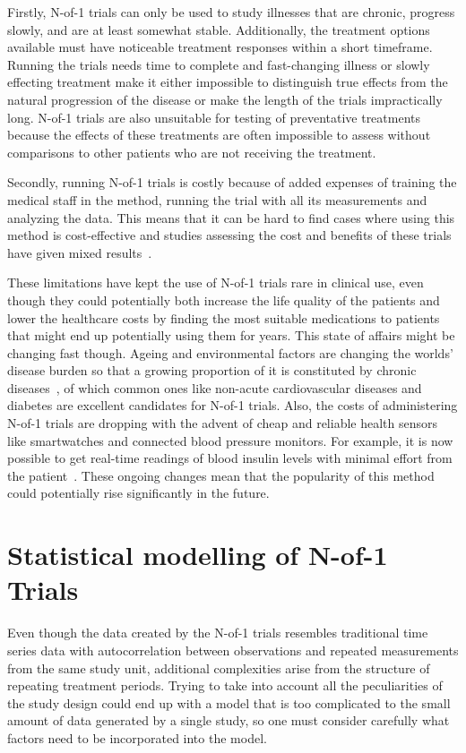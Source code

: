 \documentclass[12pt,a4paper,leqno]{report}
\theoremstyle{plain}
\theoremstyle{definition}
\theoremstyle{remark}
\begin{document}
Firstly, N-of-1 trials can only be used to study illnesses that are chronic,
progress slowly, and are at least somewhat stable. Additionally, the treatment options
available must have noticeable treatment responses within a short timeframe.
Running the trials needs time to complete and fast-changing illness or slowly
effecting treatment make it either impossible to distinguish true effects from
the natural progression of the disease or make the length of the trials
impractically long. N-of-1 trials are also unsuitable for testing of
preventative treatments because the effects of these treatments are often
impossible to assess without comparisons to other patients who are not receiving
the treatment.\ \cite{nofone}

Secondly, running N-of-1 trials is costly because of added expenses of training
the medical staff in the method, running the trial with all its measurements and
analyzing the data. This means that it can be hard to find cases where using
this method is cost-effective and studies assessing the cost and benefits of these trials
have given mixed results\ \cite{costs}.

These limitations have kept the use of N-of-1 trials rare in clinical use, even
though they could potentially both increase the life quality of the patients and
lower the healthcare costs by finding the most suitable medications to patients that
might end up potentially using them for years. This state of affairs might be
changing fast though. Ageing and environmental factors are changing the worlds'
disease burden so that a growing proportion of it is constituted by chronic
diseases\ \cite{diseaseburden}, of which common ones like non-acute cardiovascular
diseases and diabetes are excellent candidates for N-of-1 trials. Also, the costs
of administering N-of-1 trials are dropping with the advent of cheap and reliable
health sensors like smartwatches and connected blood pressure monitors. For
example, it is now possible to get real-time readings of
blood insulin levels with minimal effort from the patient\ \cite{cgm}. These
ongoing changes mean that the popularity of this method could potentially rise
significantly in the future.

\chapter{Statistical modelling of N-of-1 Trials}\label{modelling}

Even though the data created by the N-of-1 trials resembles traditional time
series data with autocorrelation between observations and repeated measurements
from the same study unit, additional complexities arise from the structure of
repeating treatment periods. Trying to take into account all
the peculiarities of the study design could end up with a model that is too complicated to
the small amount of data generated by a single study, so one must consider
carefully what factors need to be incorporated into the model.
\end{document}
